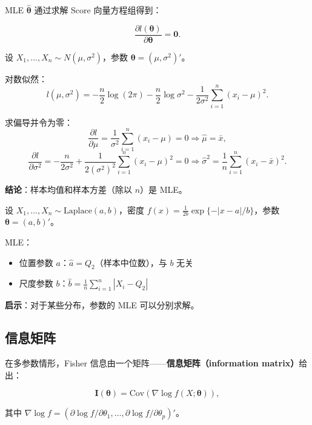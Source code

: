 MLE $\widehat{\boldsymbol{\theta}}$ 通过求解 Score 向量方程组得到：

\[
\frac{\partial l(\boldsymbol{\theta})}{\partial \boldsymbol{\theta}} = \mathbf{0}.
\label{eq:score-equation-multiparameter}
\]

\begin{example}\label{ex:normal-mle-multiparameter}
设 $X_1, \ldots, X_n \sim N(\mu, \sigma^2)$，参数 $\boldsymbol{\theta} = (\mu, \sigma^2)'$。

对数似然：
\[
l(\mu, \sigma^2) = -\frac{n}{2}\log(2\pi) - \frac{n}{2}\log\sigma^2 - \frac{1}{2\sigma^2}\sum_{i=1}^n (x_i - \mu)^2.
\]

求偏导并令为零：
\[
\frac{\partial l}{\partial \mu} = \frac{1}{\sigma^2}\sum_{i=1}^n (x_i - \mu) = 0 \Rightarrow \widehat{\mu} = \bar{x},
\]
\[
\frac{\partial l}{\partial \sigma^2} = -\frac{n}{2\sigma^2} + \frac{1}{2(\sigma^2)^2}\sum_{i=1}^n (x_i - \mu)^2 = 0 \Rightarrow \widehat{\sigma}^2 = \frac{1}{n}\sum_{i=1}^n (x_i - \bar{x})^2.
\]

\textbf{结论}：样本均值和样本方差（除以 $n$）是 MLE。
\end{example}

\begin{example}\label{ex:laplace-mle-multiparameter}
设 $X_1, \ldots, X_n \sim \text{Laplace}(a, b)$，密度 $f(x) = \frac{1}{2b}\exp\{-|x-a|/b\}$，参数 $\boldsymbol{\theta} = (a, b)'$。

MLE：
\begin{itemize}
\item 位置参数 $a$：$\widehat{a} = Q_2$（样本中位数），与 $b$ 无关
\item 尺度参数 $b$：$\widehat{b} = \frac{1}{n}\sum_{i=1}^n |X_i - Q_2|$
\end{itemize}

\textbf{启示}：对于某些分布，参数的 MLE 可以分别求解。
\end{example}

\subsection{信息矩阵}

在多参数情形，Fisher 信息由一个矩阵——\textbf{信息矩阵（information matrix）}给出：

\[
\mathbf{I}(\boldsymbol{\theta}) = \text{Cov}\left( \nabla \log f(X; \boldsymbol{\theta}) \right),
\label{eq:information-matrix}
\]

其中 $\nabla \log f = (\partial \log f/\partial \theta_1, \ldots, \partial \log f/\partial \theta_p)'$。

